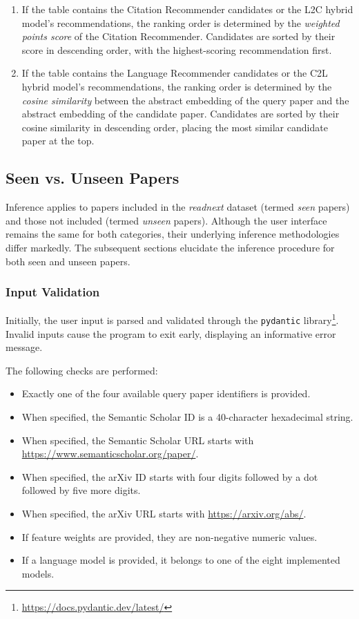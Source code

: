 \begin{enumerate}
    \item If the table contains the Citation Recommender candidates or the \ac{L2C} hybrid model's recommendations,
          the ranking order is determined by the \emph{weighted points score} of the Citation Recommender. Candidates are sorted by their score in descending order, with the highest-scoring recommendation first.
    \item If the table contains the Language Recommender candidates or the \ac{C2L} hybrid model's recommendations,
          the ranking order is determined by the \emph{cosine similarity} between the abstract embedding of the query paper and the abstract embedding of the candidate paper. Candidates are sorted by their cosine similarity in descending order, placing the most similar candidate paper at the top.
\end{enumerate}


\subsection{Seen vs. Unseen Papers} \label{sec:seen-vs-unseen-papers}

Inference applies to papers included in the \emph{readnext} dataset (termed \emph{seen} papers) and those not included (termed \emph{unseen} papers). Although the user interface remains the same for both categories, their underlying inference methodologies differ markedly. The subsequent sections elucidate the inference procedure for both seen and unseen papers.

\subsubsection*{Input Validation}

Initially, the user input is parsed and validated through the \texttt{pydantic} library\footnote{\url{https://docs.pydantic.dev/latest/}}. Invalid inputs cause the program to exit early, displaying an informative error message.

The following checks are performed:

\begin{itemize}
    \item Exactly one of the four available query paper identifiers is provided.
    \item When specified, the Semantic Scholar ID is a 40-character hexadecimal string.
    \item When specified, the Semantic Scholar URL starts with \url{https://www.semanticscholar.org/paper/}.
    \item When specified, the arXiv ID starts with four digits followed by a dot followed by five more digits.
    \item When specified, the arXiv URL starts with \url{https://arxiv.org/abs/}.
    \item If feature weights are provided, they are non-negative numeric values.
    \item If a language model is provided, it belongs to one of the eight implemented models.
\end{itemize}

